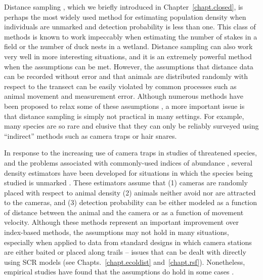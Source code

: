 Distance sampling \citep{buckland_etal:2001,buckland_etal:2004book}, which we briefly
introduced in Chapter~\ref{chapt.closed},
is perhaps the most widely used method for
estimating population density when individuals are unmarked and
detection probability is less than one. This class of methods is known
to work impeccably when estimating the number of stakes in a field or
the number of duck nests in a wetland. Distance sampling can also work very well in
more interesting situations, and it is an extremely powerful method when
the assumptions can be met. However, the assumptions that distance
data can be recorded without error and that animals are distributed
randomly with respect to the transect can be easily violated by
common processes such as animal movement and measurement
error. Although numerous methods have been proposed to
relax some of these assumptions
\citet{royle_etal:2004, borchers_etal:1998, johnson_etal:2010,
  marques_etal:2010, chandler_etal:2011},
a more important issue is that distance
sampling is simply not practical in many settings. For example, many
species are so rare and elusive that they can only be reliably
surveyed using ``indirect'' methods such as camera traps or hair
snares.

In response to the increasing use of camera traps in studies of
threatened species, and the problems associated with commonly-used
indices of abundance %
\citep{jennelle_etal:2002,obrien:2011,sollmann_etal:2013bioc},
several density estimators
have been developed for situations in which the species being
studied is unmarked \citet{rowcliffe_etal:2008,rowcliffe_etal:2011}.
These estimators assume that (1) cameras are randomly placed with
respect to animal density (2) animals neither avoid nor are attracted
to the cameras, and (3) detection probability can be either modeled as a function of
distance between the animal and the camera or as a function of
movement velocity. Although these methods
represent an important improvement over index-based methods,
the assumptions may not hold in many situations, especially when
applied to data from standard designs in which camera stations are
either baited or placed along trails -- issues that can be dealt with
directly using SCR models (see Chapts.~\ref{chapt.ecoldist} and~\ref{chapt.rsf}).
Nonetheless, empirical studies
have found that the assumptions do hold in some cases
\citep{rowcliffe_etal:2008}.

